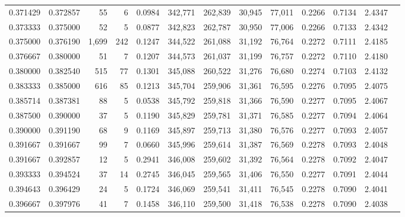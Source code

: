 \begin{tabular}{rrrrrrrrrrrrr}
0.371429 & 0.372857 &     55 &      6 &                                     0.0984 & 342,771 & 262,839 &  30,945 &  77,011 & 0.2266 & 0.7134 & 2.4347 \\
0.373333 & 0.375000 &     52 &      5 &                                     0.0877 & 342,823 & 262,787 &  30,950 &  77,006 & 0.2266 & 0.7133 & 2.4342 \\
0.375000 & 0.376190 &  1,699 &    242 &                                     0.1247 & 344,522 & 261,088 &  31,192 &  76,764 & 0.2272 & 0.7111 & 2.4185 \\
0.376667 & 0.380000 &     51 &      7 &                                     0.1207 & 344,573 & 261,037 &  31,199 &  76,757 & 0.2272 & 0.7110 & 2.4180 \\
0.380000 & 0.382540 &    515 &     77 &                                     0.1301 & 345,088 & 260,522 &  31,276 &  76,680 & 0.2274 & 0.7103 & 2.4132 \\
0.383333 & 0.385000 &    616 &     85 &                                     0.1213 & 345,704 & 259,906 &  31,361 &  76,595 & 0.2276 & 0.7095 & 2.4075 \\
0.385714 & 0.387381 &     88 &      5 &                                     0.0538 & 345,792 & 259,818 &  31,366 &  76,590 & 0.2277 & 0.7095 & 2.4067 \\
0.387500 & 0.390000 &     37 &      5 &                                     0.1190 & 345,829 & 259,781 &  31,371 &  76,585 & 0.2277 & 0.7094 & 2.4064 \\
0.390000 & 0.391190 &     68 &      9 &                                     0.1169 & 345,897 & 259,713 &  31,380 &  76,576 & 0.2277 & 0.7093 & 2.4057 \\
0.391667 & 0.391667 &     99 &      7 &                                     0.0660 & 345,996 & 259,614 &  31,387 &  76,569 & 0.2278 & 0.7093 & 2.4048 \\
0.391667 & 0.392857 &     12 &      5 &                                     0.2941 & 346,008 & 259,602 &  31,392 &  76,564 & 0.2278 & 0.7092 & 2.4047 \\
0.393333 & 0.394524 &     37 &     14 &                                     0.2745 & 346,045 & 259,565 &  31,406 &  76,550 & 0.2277 & 0.7091 & 2.4044 \\
0.394643 & 0.396429 &     24 &      5 &                                     0.1724 & 346,069 & 259,541 &  31,411 &  76,545 & 0.2278 & 0.7090 & 2.4041 \\
0.396667 & 0.397976 &     41 &      7 &                                     0.1458 & 346,110 & 259,500 &  31,418 &  76,538 & 0.2278 & 0.7090 & 2.4038 \\

\end{tabular}
